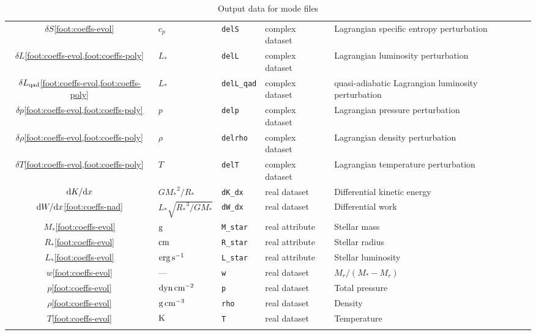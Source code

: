 \documentclass{article}
\newcommand{\diff}{\ensuremath{{\rm d}}}
\newcommand{\Rstar}{\ensuremath{R_{\ast}}}
\newcommand{\Mstar}{\ensuremath{M_{\ast}}}
\newcommand{\Lstar}{\ensuremath{L_{\ast}}}
\newcommand{\cm}{\ensuremath{{\rm cm}}}
\newcommand{\gram}{\ensuremath{{\rm g}}}
\newcommand{\second}{\ensuremath{{\rm s}}}
\newcommand{\dyne}{\ensuremath{{\rm dyn}}}
\newcommand{\erg}{\ensuremath{{\rm erg}}}
\newcommand{\kelvin}{\ensuremath{{\rm K}}}
\begin{document}
\begin{landscape}
\begin{center}
\begin{longtable}{cllll}
$\delta S$\cref{foot:coeffs-evol} & $c_{p}$ & \texttt{delS} & complex dataset & Lagrangian specific entropy perturbation \\
$\delta L$\cref{foot:coeffs-evol,foot:coeffs-poly} & \Lstar & \texttt{delL} & complex dataset & Lagrangian luminosity perturbation \\
$\delta L_{\rm qad}$\cref{foot:coeffs-evol,foot:coeffs-poly} & \Lstar & \texttt{delL\_qad} & complex dataset & quasi-adiabatic Lagrangian luminosity perturbation \\
$\delta p$\cref{foot:coeffs-evol,foot:coeffs-poly} & $p$ & \texttt{delp} & complex dataset & Lagrangian pressure perturbation \\
$\delta \rho$\cref{foot:coeffs-evol,foot:coeffs-poly} & $\rho$ & \texttt{delrho} & complex dataset & Lagrangian density perturbation \\
$\delta T$\cref{foot:coeffs-evol,foot:coeffs-poly} & $T$ & \texttt{delT} & complex dataset & Lagrangian temperature perturbation \\
$\diff K/\diff x$ & $G\Mstar^{2}/\Rstar$ & \texttt{dK\_dx} & real dataset & Differential kinetic energy \\
$\diff W/\diff x$\cref{foot:coeffs-nad} & $\Lstar \sqrt{\Rstar^{3}/G\Mstar}$ & \texttt{dW\_dx} & real dataset & Differential work \\ 
\Mstar\cref{foot:coeffs-evol} & \gram & \texttt{M\_star} & real attribute & Stellar mass \\
\Rstar\cref{foot:coeffs-evol} & \cm & \texttt{R\_star} & real attribute & Stellar radius \\
\Lstar\cref{foot:coeffs-evol} & $\erg\,\second^{-1}$ & \texttt{L\_star} & real attribute & Stellar luminosity \\
$w$\cref{foot:coeffs-evol} & --- & \texttt{w} & real dataset & $M_{r}/(\Mstar-M_{r})$ \\
$p$\cref{foot:coeffs-evol} & $\dyne\,\cm^{-2}$ & \texttt{p} & real dataset & Total pressure \\
$\rho$\cref{foot:coeffs-evol} & $\gram\,\cm^{-3}$ & \texttt{rho} & real dataset & Density \\
$T$\cref{foot:coeffs-evol} & $\kelvin$ & \texttt{T} & real dataset & Temperature \\ \hline
\caption{Output data for mode files}
\end{longtable}
\end{center}
\end{landscape}



\end{document}
